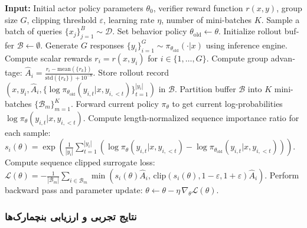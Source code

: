 \begin{latin}
\begin{algorithm}[htbp]
\caption{Group Sequence Policy Optimization (GSPO)}
\label{alg:gspo_algorithm}
\begin{algorithmic}[1]
\State \textbf{Input:} Initial actor policy parameters $\theta_0$, verifier reward function $r(x, y)$, group size $G$, clipping threshold $\varepsilon$, learning rate $\eta$, number of mini-batches $K$.
    \State Sample a batch of queries $\{x_j\}_{j=1}^B \sim \mathcal{D}$.
    \State Set behavior policy $\theta_{\text{old}} \leftarrow \theta$.
    \State Initialize rollout buffer $\mathcal{B} \leftarrow \emptyset$.
        \State Generate $G$ responses $\{y_i\}_{i=1}^G \sim \pi_{\theta_{\text{old}}}(\cdot|x)$ using inference engine.
        \State Compute scalar rewards $r_i = r(x, y_i)$ for $i \in \{1, \dots, G\}$.
        \State Compute group advantage: $\hat{A}_i = \frac{r_i - \text{mean}(\{r_k\})}{\text{std}(\{r_k\}) + 10^{-8}}$.
            \State Store rollout record $(x, y_i, \hat{A}_i, \{\log \pi_{\theta_{\text{old}}}(y_{i,t}|x, y_{i,<t})\}_{t=1}^{|y_i|})$ in $\mathcal{B}$.
        \EndFor
    \EndFor
    \State Partition buffer $\mathcal{B}$ into $K$ mini-batches $\{\mathcal{B}_m\}_{m=1}^K$.
        \State Forward current policy $\pi_\theta$ to get current log-probabilities $\log \pi_\theta(y_{i,t}|x, y_{i,<t})$.
        \State Compute length-normalized sequence importance ratio for each sample:
        \State \quad $s_i(\theta) = \exp\left( \frac{1}{|y_i|} \sum_{t=1}^{|y_i|} \left( \log \pi_\theta(y_{i,t}|x, y_{i,<t}) - \log \pi_{\theta_{\text{old}}}(y_{i,t}|x, y_{i,<t}) \right) \right)$.
        \State Compute sequence clipped surrogate loss:
        \State \quad $\mathcal{L}(\theta) = -\frac{1}{|\mathcal{B}_m|} \sum_{i \in \mathcal{B}_m} \min\left( s_i(\theta)\hat{A}_i, \, \text{clip}(s_i(\theta), 1-\varepsilon, 1+\varepsilon)\hat{A}_i \right)$.
        \State Perform backward pass and parameter update:
        \State \quad $\theta \leftarrow \theta - \eta \, \nabla_\theta \mathcal{L}(\theta)$.
    \EndFor
\EndFor
\end{algorithmic}
\end{algorithm}
\end{latin}

\subsubsection*{نتایج تجربی و ارزیابی بنچمارک‌ها}

